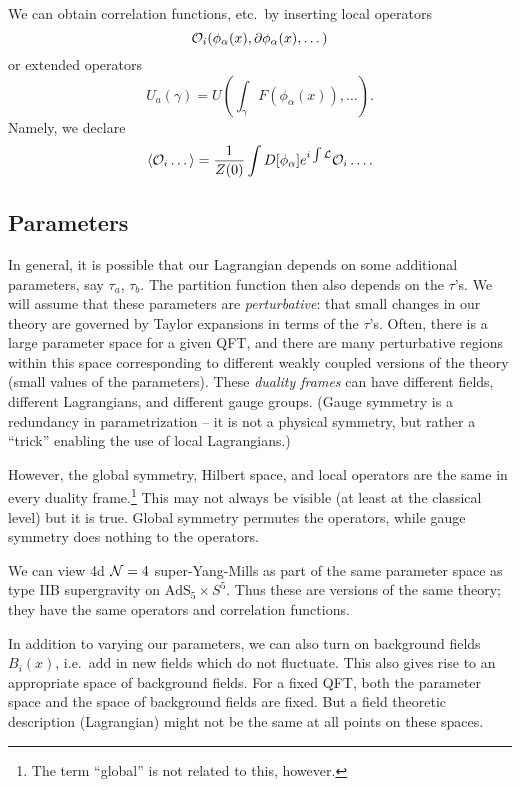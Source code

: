 We can obtain correlation functions, etc.\ by inserting local operators
\[
	\mathcal{O}_i(\phi_\alpha(x), \partial \phi_\alpha(x), \dots)
\]
or extended operators
\[
	U_a(\gamma) = U\left(\int_\gamma F(\phi_\alpha(x)), \dots\right).
\]
Namely, we declare
\[
	\langle \mathcal{O}_i \dots \rangle = \frac{1}{Z(0)} \int D[\phi_\alpha] e^{i \int \mathcal{L}} \mathcal{O}_i \dots.
\]

\subsection{Parameters}

In general, it is possible that our Lagrangian depends on some additional parameters, say $\tau_a$, $\tau_b$.
The partition function then also depends on the $\tau$'s.
We will assume that these parameters are \emph{perturbative}: that small changes in our theory are governed by Taylor expansions in terms of the $\tau$'s.
Often, there is a large parameter space for a given QFT, and there are many perturbative regions within this space corresponding to different weakly coupled versions of the theory (small values of the parameters).
These \emph{duality frames} can have different fields, different Lagrangians, and different gauge groups.
(Gauge symmetry is a redundancy in parametrization -- it is not a physical symmetry, but rather a ``trick'' enabling the use of local Lagrangians.)

However, the global symmetry, Hilbert space, and local operators are the same in every duality frame.\footnote{The term ``global'' is not related to this, however.}
This may not always be visible (at least at the classical level) but it is true.
Global symmetry permutes the operators, while gauge symmetry does nothing to the operators.

\begin{ex}
	We can view 4d $\mathcal{N} = 4$ super-Yang-Mills as part of the same parameter space as type IIB supergravity on $\mathrm{AdS}_5 \times S^5$.
	Thus these are versions of the same theory; they have the same operators and correlation functions.
\end{ex}

In addition to varying our parameters, we can also turn on background fields $B_i(x)$, i.e.\ add in new fields which do not fluctuate. This also gives rise to an appropriate space of background fields.
For a fixed QFT, both the parameter space and the space of background fields are fixed. But a field theoretic description (Lagrangian) might not be the same at all points on these spaces.

